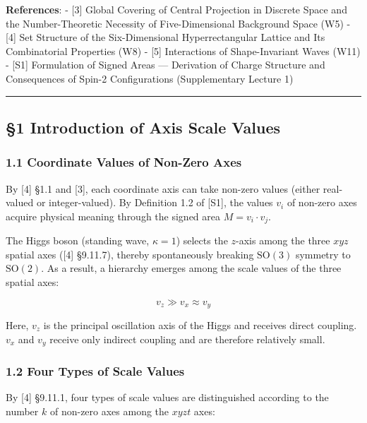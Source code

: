 \documentclass[
  a4paper,11pt]{article}
\theoremstyle{definition}
\theoremstyle{remark}
\begin{document}
\textbf{References}: - {[}3{]} Global Covering of Central Projection in
Discrete Space and the Number-Theoretic Necessity of Five-Dimensional
Background Space (W5) - {[}4{]} Set Structure of the Six-Dimensional
Hyperrectangular Lattice and Its Combinatorial Properties (W8) - {[}5{]}
Interactions of Shape-Invariant Waves (W11) - {[}S1{]} Formulation of
Signed Areas --- Derivation of Charge Structure and Consequences of
Spin-2 Configurations (Supplementary Lecture 1)

\begin{center}\rule{0.5\linewidth}{0.5pt}\end{center}

\subsection{§1 Introduction of Axis Scale
Values}\label{introduction-of-axis-scale-values}

\subsubsection{1.1 Coordinate Values of Non-Zero
Axes}\label{coordinate-values-of-non-zero-axes}

By {[}4{]} §1.1 and {[}3{]}, each coordinate axis can take non-zero
values (either real-valued or integer-valued). By Definition 1.2 of
{[}S1{]}, the values \(v_i\) of non-zero axes acquire physical meaning
through the signed area \(M = v_i \cdot v_j\).

The Higgs boson (standing wave, \(\kappa = 1\)) selects the \(z\)-axis
among the three \(xyz\) spatial axes ({[}4{]} §9.11.7), thereby
spontaneously breaking \(\mathrm{SO}(3)\) symmetry to
\(\mathrm{SO}(2)\). As a result, a hierarchy emerges among the scale
values of the three spatial axes:

\[v_z \gg v_x \approx v_y\]

Here, \(v_z\) is the principal oscillation axis of the Higgs and
receives direct coupling. \(v_x\) and \(v_y\) receive only indirect
coupling and are therefore relatively small.

\subsubsection{1.2 Four Types of Scale
Values}\label{four-types-of-scale-values}

By {[}4{]} §9.11.1, four types of scale values are distinguished
according to the number \(k\) of non-zero axes among the \(xyzt\) axes:
\end{document}
